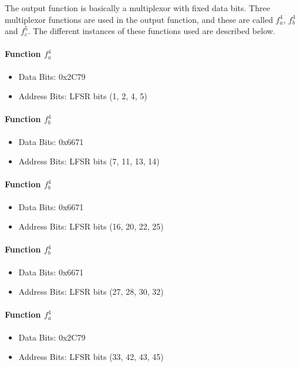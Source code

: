 The output function is basically a multiplexor with fixed data bits. Three multiplexor functions are used in the output function, and these are called $f_a^4$, $f_b^4$ and $f_c^5$. The different instances of these functions used are described below.

\paragraph{Function $f_a^4$}
\begin{itemize}
\item Data Bits: 0x2C79
\item Address Bits: LFSR bits (1, 2, 4, 5)
\end{itemize}

\paragraph{Function $f_b^4$}
\begin{itemize}
\item Data Bits: 0x6671
\item Address Bits: LFSR bits (7, 11, 13, 14)
\end{itemize}

\paragraph{Function $f_b^4$}
\begin{itemize}
\item Data Bits: 0x6671
\item Address Bits: LFSR bits (16, 20, 22, 25)
\end{itemize}

\paragraph{Function $f_b^4$}
\begin{itemize}
\item Data Bits: 0x6671
\item Address Bits: LFSR bits (27, 28, 30, 32)
\end{itemize}

\paragraph{Function $f_a^4$}
\begin{itemize}
\item Data Bits: 0x2C79
\item Address Bits: LFSR bits (33, 42, 43, 45)
\end{itemize}

